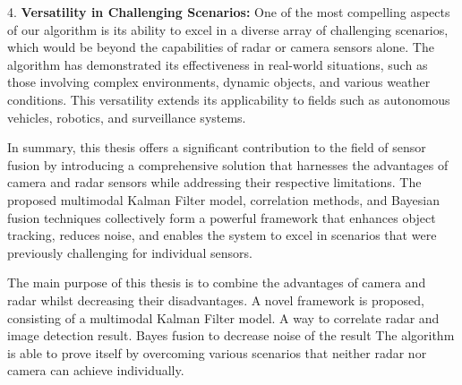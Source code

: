 4. \textbf{Versatility in Challenging Scenarios: }
One of the most compelling aspects of our algorithm is its ability to excel in a diverse array of challenging scenarios,
which would be beyond the capabilities of radar or camera sensors alone. 
The algorithm has demonstrated its effectiveness in real-world situations, 
such as those involving complex environments, dynamic objects, and various weather conditions. 
This versatility extends its applicability to fields such as autonomous vehicles,
robotics, and surveillance systems.

In summary, this thesis offers a significant contribution to the field of sensor fusion by introducing a comprehensive solution 
that harnesses the advantages of camera and radar sensors while addressing their respective limitations.
 The proposed multimodal Kalman Filter model, correlation methods, and Bayesian fusion techniques collectively form 
 a powerful framework that enhances object tracking, reduces noise, and enables the system to excel in scenarios that were previously challenging for individual sensors.


The main purpose of this thesis is to combine the advantages of camera and radar whilst decreasing their disadvantages.
A novel framework is proposed, consisting of a multimodal Kalman Filter model. 
A way to correlate radar and image detection result.
Bayes fusion to decrease noise of the result
The algorithm is able to prove itself by overcoming various scenarios that neither radar nor camera can achieve individually.

